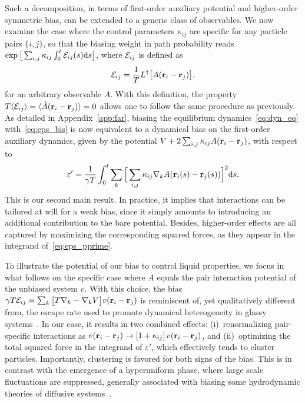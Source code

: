 \documentclass[pre, superscriptaddress, twocolumn,pre]{revtex4-1}
\begin{document}
Such a decomposition, in terms of first-order auxiliary potential and higher-order symmetric bias, can be extended to a generic class of observables. We now examine the case where the control parameters $\kappa_{ij}$ are specific for any particle pairs $\{i,j\}$, so that the biasing weight in path probability reads $\exp\big[\sum_{i,j}\kappa_{ij}\int_0^t{\cal E}_{ij}(s){\rm d}s\big]$, where ${\cal E}_{ij}$ is defined as
\begin{equation}\label{eq:eps_bis}
	{\cal E}_{ij} = \frac{1}{T} L^\dagger\big[ A({\bf r}_i-{\bf r}_j)\big] ,
\end{equation}
for an arbitrary observable $A$. With this definition, the property $T\langle{\cal E}_{ij}\rangle = \langle\dot A({\bf r}_i-{\bf r}_j)\rangle = 0$ allows one to follow the same procedure as previously. As detailed in Appendix~\ref{app:far}, biasing the equilibrium dynamics~\eqref{eq:dyn_eq} with~\eqref{eq:eps_bis} is now equivalent to a dynamical bias on the first-order auxiliary dynamics, given by the potential $V+2\sum_{i,j}\kappa_{ij}A({\bf r}_i-{\bf r}_j)$, with respect to
\begin{equation}\label{eq:eps_pprime}
	\varepsilon' = \frac{1}{\gamma T}\int_0^t\sum_k\Big[\sum_{i,j}\kappa_{ij} \nabla_kA({\bf r}_i(s)-{\bf r}_j(s))\Big]^2{\rm d}s .
\end{equation}
This is our second main result. In practice, it implies that interactions can be tailored at will for a weak bias, since it simply amounts to introducing an additional contribution to the bare potential. Besides, higher-order effects are all captured by maximizing the corresponding squared forces, as they appear in the integrand of~\eqref{eq:eps_pprime}.


To illustrate the potential of our bias to control liquid properties, we focus in what follows on the specific case where $A$ equals the pair interaction potential of the unbiased system $v$. With this choice, the bias $\gamma T{\cal E}_{ij} = \sum_k\big[T\nabla_k - \nabla_kV\big]v({\bf r}_i-{\bf r}_j)$ is reminiscent of, yet qualitatively different from, the escape rate used to promote dynamical heterogeneity in glassy systems~\cite{Pitard2011, Fullerton2013}. In our case, it results in two combined effects: (i)~renormalizing pair-specific interactions as $v({\bf r}_i-{\bf r}_j)\to[1+\kappa_{ij}]\,v({\bf r}_i-{\bf r}_j)$, and (ii)~optimizing the total squared force in the integrand of $\varepsilon'$, which effectively tends to cluster particles. Importantly, clustering is favored for both signs of the bias. This is in contrast with the emergence of a hyperuniform phase, where large scale fluctuations are suppressed, generally associated with biasing some hydrodynamic theories of diffusive systems~\cite{Jack2015b}.
\end{document}
